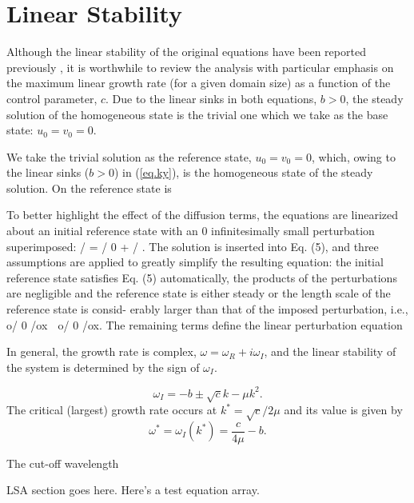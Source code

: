 \documentclass{ws-ijbc}
\newcommand\beq{\begin{equation}}
\newcommand\eeq{\end{equation}}
\begin{document}
\section{Linear Stability}
\label{sec.lsa}

Although the linear stability of the original equations have been reported previously \cite{kreiss02, fullmer14b}, it is worthwhile to review the analysis with particular emphasis on the maximum linear growth rate (for a given domain size) as a function of the control parameter, $c$. Due to the linear sinks in both equations, $b > 0$, the steady solution of the homogeneous state is the trivial one which we take as the base state: $u_0 = v_0 = 0$. 

We take the trivial solution as the reference state, $u_0 = v_0 = 0$, which, owing to the linear sinks ($b > 0$) in  (\ref{eq.ky}), is the homogeneous state of the steady solution. On the reference state is  


To better highlight the effect of the diffusion terms, the equations are linearized about an initial reference state with an
0
infinitesimally small perturbation superimposed: / = / 0 + / . The solution is inserted into Eq. (5), and three assumptions are
applied to greatly simplify the resulting equation: the initial reference state satisfies Eq. (5) automatically, the products of
the perturbations are negligible and the reference state is either steady or the length scale of the reference state is consid-
erably larger than that of the imposed perturbation, i.e., o/ 0 /ox  o/ 0 /ox. The remaining terms define the linear perturbation
equation


In general, the growth rate is complex, $\omega = \omega_R + i \omega_I$, and the linear stability of the system is determined by the sign of $\omega_I$. 

\beq
\omega_I = -b \pm \sqrt{c} k -\mu k^2 .
\label{eq.omega}
\eeq
The critical (largest) growth rate occurs at $k^* = \sqrt{c} / 2 \mu$ and its value is given by
\beq
\omega^* = \omega_I (k^*) = \frac{{c}}{{4 \mu}} - b .
\label{eq.omega}
\eeq



The cut-off wavelength



LSA section goes here. Here's a test equation array. 
\end{document}
